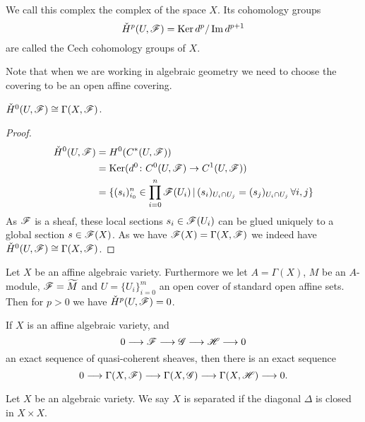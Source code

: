 \begin{definition}
We call this complex the \Cech complex of the space $X$. Its cohomology groups 
\begin{equation*}
    \check{H}^p(U,\mathscr{F}) = \operatorname{Ker} d^p/\operatorname{Im} d^{p+1}
\end{equation*}
are called the Cech cohomology groups of $X$.
\end{definition}

Note that when we are working in algebraic geometry we need to choose the covering to be an open affine covering. 

\begin{proposition}
$\check{H}^0(U,\mathscr{F}) \cong \Gamma(X,\mathscr{F})$.
\end{proposition}
\begin{proof}
\begin{align*}
    \check{H}^0(U,\mathscr{F}) 
    &= H^0(C^*(U,\mathscr{F})) \\
    &= \operatorname{Ker}(d^0\colon C^0(U,\mathscr{F})\to C^1(U,\mathscr{F})) \\
    &= \{ (s_i)_{i_0}^n \in \prod_{i=0}^n \mathscr{F}(U_i) \,\vert\, (s_i)_{U_i\cap U_j} = (s_j)_{U_i\cap U_j} \, \forall i,j\}
\end{align*}
As $\mathscr{F}$ is a sheaf, these local sections $s_i\in \mathscr{F}(U_i)$ can be glued uniquely to a global section $s\in \mathscr{F}(X)$. As we have $\mathscr{F}(X)=\Gamma(X,\mathscr{F})$ we indeed have $\check{H}^0(U,\mathscr{F})\cong \Gamma(X,\mathscr{F})$. 
\end{proof}

\begin{theorem}
Let $X$ be an affine algebraic variety. Furthermore we let $A=\Gamma(X)$, $M$ be an $A$-module, $\mathscr{F} = \widetilde{M}$ and $U=\{U_i\}_{i=0}^m$ an open cover of standard open affine sets. Then for $p>0$ we have $\check{H}^p(U,\mathscr{F})=0$. 
\end{theorem}

\begin{corollary}
If $X$ is an affine algebraic variety, and
\begin{equation*}
    0\longrightarrow \mathscr{F}\longrightarrow\mathscr{G}\longrightarrow\mathscr{H}\longrightarrow 0
\end{equation*}
an exact sequence of quasi-coherent sheaves, then there is an exact sequence 
\begin{equation*}
    0\longrightarrow \Gamma(X,\mathscr{F})\longrightarrow \Gamma(X,\mathscr{G})\longrightarrow \Gamma(X,\mathscr{H})\longrightarrow 0.
\end{equation*}
\end{corollary}

\begin{definition}
Let $X$ be an algebraic variety. We say $X$ is separated if the diagonal $\Delta$ is closed in $X\times X$.
\end{definition}

